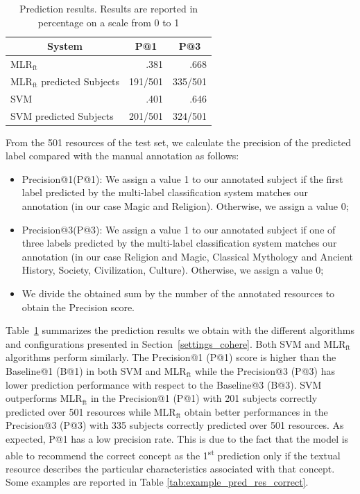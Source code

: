 \documentclass[epsfig,a4paper,12pt,titlepage]{book}
\newcommand{\mlr}{MLR$_\text{ft}$\xspace}
\begin{document}
\begin{table}[H]

\caption{Prediction results. Results are reported in percentage on a scale from 0 to 1}
		\label{tab:prediction_tab}       %
\centering
\begin{tabular}{|l|r|r|} \hline
\multicolumn{1}{|c|}{System} & \multicolumn{1}{|c|}{P@1}& \multicolumn{1}{|c|}{P@3}  \\ \hline

\mlr  & .381 & .668 \\ \hline
\mlr predicted Subjects  & 191/501 & 335/501 \\ \hline
SVM & .401 & .646 \\ \hline
SVM predicted Subjects  & 201/501 & 324/501 \\ \hline
\end{tabular}
\end{table}
From the 501 resources of the test set, we calculate the precision of the predicted label compared with the manual annotation as follows:

    \begin{itemize}
        \item Precision@1(P@1): We assign a value 1 to our annotated subject if the first label predicted by the multi-label classification system matches our annotation (in our case Magic and Religion). Otherwise, we assign a value 0;
        \item Precision@3(P@3): We assign a value 1 to our annotated subject if one of three labels predicted by the multi-label classification system matches our annotation (in our case Religion and Magic, Classical Mythology and Ancient History, Society, Civilization, Culture). Otherwise, we assign a value 0;
        \item We divide the obtained sum by the number of the annotated resources to obtain the Precision score.
    \end{itemize}
    
Table~\ref{tab:prediction_tab} summarizes the prediction results we obtain with the different algorithms and configurations presented in Section~\ref{settings_cohere}. Both SVM and \mlr algorithms perform similarly. The Precision@1 (P@1) score is higher than the Baseline@1 (B@1) in both SVM and \mlr while the Precision@3 (P@3) has lower prediction performance with respect to the Baseline@3 (B@3). SVM outperforms \mlr in the Precision@1 (P@1) with 201 subjects correctly predicted over 501 resources while \mlr obtain better performances in the Precision@3 (P@3) with 335 subjects correctly predicted over 501 resources. As expected, P@1 has a low precision rate. This is due to the fact that the model is able to recommend the correct concept as the 1\textsuperscript{st} prediction only if the textual resource describes the particular characteristics associated with that concept. 
Some examples are reported in Table \ref{tab:example_pred_res_correct}.
\end{document}
